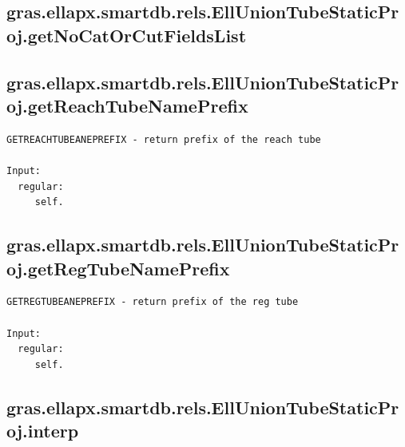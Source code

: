 \documentclass[letterpaper,10pt,english]{sphinxmanual}
\begin{document}
\subsection{gras.ellapx.smartdb.rels.EllUnionTubeStaticProj.getNoCatOrCutFieldsList}
\label{chap_functions:gras-ellapx-smartdb-rels-elluniontubestaticproj-getnocatorcutfieldslist}

\subsection{gras.ellapx.smartdb.rels.EllUnionTubeStaticProj.getReachTubeNamePrefix}
\label{chap_functions:gras-ellapx-smartdb-rels-elluniontubestaticproj-getreachtubenameprefix}
\begin{Verbatim}[commandchars=\\\{\}]
GETREACHTUBEANEPREFIX - return prefix of the reach tube

Input:
  regular:
     self.
\end{Verbatim}


\subsection{gras.ellapx.smartdb.rels.EllUnionTubeStaticProj.getRegTubeNamePrefix}
\label{chap_functions:gras-ellapx-smartdb-rels-elluniontubestaticproj-getregtubenameprefix}
\begin{Verbatim}[commandchars=\\\{\}]
GETREGTUBEANEPREFIX - return prefix of the reg tube

Input:
  regular:
     self.
\end{Verbatim}


\subsection{gras.ellapx.smartdb.rels.EllUnionTubeStaticProj.interp}
\label{chap_functions:gras-ellapx-smartdb-rels-elluniontubestaticproj-interp}
\end{document}
